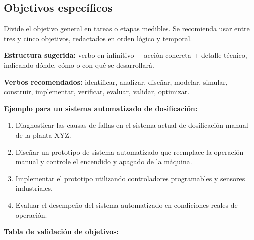 \documentclass[12pt,letterpaper]{report}
\begin{document}
\subsection{Objetivos específicos}
\begin{instrucciones}
Divide el objetivo general en tareas o etapas medibles. Se recomienda usar entre tres y cinco objetivos, redactados en orden lógico y temporal.

\vspace{2mm}
\noindent \textbf{Estructura sugerida:} verbo en infinitivo + acción concreta + detalle técnico, indicando dónde, cómo o con qué se desarrollará.

\vspace{2mm}
\noindent \textbf{Verbos recomendados:} identificar, analizar, diseñar, modelar, simular, construir, implementar, verificar, evaluar, validar, optimizar.

\vspace{2mm}
\noindent \textbf{Ejemplo para un sistema automatizado de dosificación:}
\begin{enumerate}
  \item Diagnosticar las causas de fallas en el sistema actual de dosificación manual de la planta XYZ.
  \item Diseñar un prototipo de sistema automatizado que reemplace la operación manual y controle el encendido y apagado de la máquina.
  \item Implementar el prototipo utilizando controladores programables y sensores industriales.
  \item Evaluar el desempeño del sistema automatizado en condiciones reales de operación.
\end{enumerate}

\vspace{2mm}
\noindent \textbf{Tabla de validación de objetivos:}


\end{instrucciones}
\end{document}
